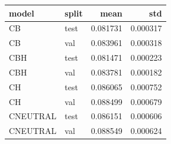 \begin{tabular}{llrr}
\toprule
model & split & mean & std \\
\midrule
CB & test & 0.081731 & 0.000317 \\
CB & val & 0.083961 & 0.000318 \\
CBH & test & 0.081471 & 0.000223 \\
CBH & val & 0.083781 & 0.000182 \\
CH & test & 0.086065 & 0.000752 \\
CH & val & 0.088499 & 0.000679 \\
CNEUTRAL & test & 0.086151 & 0.000606 \\
CNEUTRAL & val & 0.088549 & 0.000624 \\
\bottomrule
\end{tabular}
